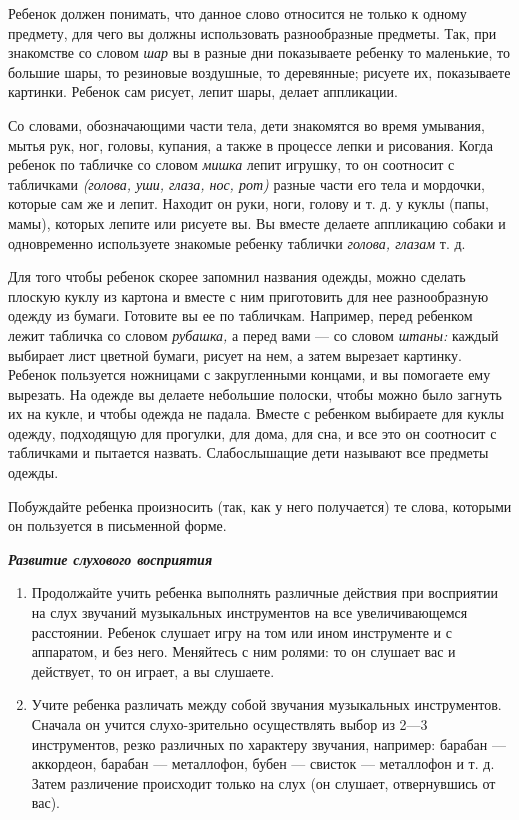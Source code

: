 \documentclass[a5paper]{book}
\renewcommand{\emph}[1]{\textit{#1}}
\begin{document}
Ребенок должен понимать, что данное слово относится не только к одному
предмету, для чего вы должны использовать разнообразные предметы. Так,
при знакомстве со словом \emph{шар} вы в разные дни показываете ребенку
то маленькие, то большие шары, то резиновые воздушные, то деревянные;
рисуете их, показываете картинки. Ребенок сам рисует, лепит шары, делает
аппликации.

Со словами, обозначающими части тела, дети знакомятся во время умывания,
мытья рук, ног, головы, купания, а также в процессе лепки и рисования.
Когда ребенок по табличке со словом \emph{мишка} лепит игрушку, то он
соотносит с табличками \emph{(голова, уши, глаза, нос, рот)} разные
части его тела и мордочки, которые сам же и лепит. Находит он руки,
ноги, голову и т. д. у куклы (папы, мамы), которых лепите или рисуете
вы. Вы вместе делаете аппликацию собаки и одновременно используете
знакомые ребенку таблички \emph{голова, глазам} т. д.

Для того чтобы ребенок скорее запомнил названия одежды, можно сделать
плоскую куклу из картона и вместе с ним приготовить для нее
разнообразную одежду из бумаги. Готовите вы ее по табличкам. Например,
перед ребенком лежит табличка со словом \emph{рубашка,} а перед вами ---
со словом \emph{штаны:} каждый выбирает лист цветной бумаги, рисует на
нем, а затем вырезает картинку. Ребенок пользуется ножницами с
закругленными концами, и вы помогаете ему вырезать. На одежде вы делаете
небольшие полоски, чтобы можно было загнуть их на кукле, и чтобы одежда
не падала. Вместе с ребенком выбираете для куклы одежду, подходящую для
прогулки, для дома, для сна, и все это он соотносит с табличками и
пытается назвать. Слабослышащие дети называют все предметы одежды.

Побуждайте ребенка произносить (так, как у него получается) те слова,
которыми он пользуется в письменной форме.

\emph{\textbf{Развитие слухового восприятия}}


\begin{enumerate}
\def\labelenumi{\arabic{enumi}.}
\item
  
  Продолжайте учить ребенка выполнять различные действия при восприятии
  на слух звучаний музыкальных инструментов на все увеличивающемся
  расстоянии. Ребенок слушает игру на том или ином инструменте и с
  аппаратом, и без него. Меняйтесь с ним ролями: то он слушает вас и
  действует, то он играет, а вы слушаете.
  
\item
  
  Учите ребенка различать между собой звучания музыкальных инструментов.
  Сначала он учится слухо-зрительно осуществлять выбор из 2---3
  инструментов, резко различных по характеру звучания, например: барабан
  --- аккордеон, барабан --- металлофон, бубен --- свисток ---
  металлофон и т. д. Затем различение происходит только на слух (он
  слушает, отвернувшись от вас).
  
\end{enumerate}
\end{document}
